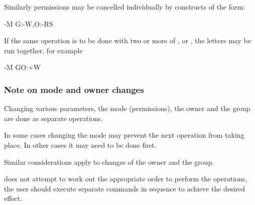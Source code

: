 Similarly permissions may be cancelled individually by constructs of the form:

\begin{expara}

{}-M G:-W,O:-RS

\end{expara}

If the same operation is to be done with two or more of ,  or
, the letters may be run together, for example

\begin{expara}

{}-M GO:+W

\end{expara}

\subsubsection{Note on mode and owner changes}
Changing various parameters, the mode (permissions), the owner and the group are done as separate operations.

In some cases changing the mode may prevent the next operation from taking place. In other cases it may need to be done first.

Similar considerations apply to changes of the owner and the group.

\PrBtjchange{} does not attempt to work out the appropriate order to perform the operations, the user should execute
separate \PrBtjchange{} commands in sequence to achieve the desired effect.

